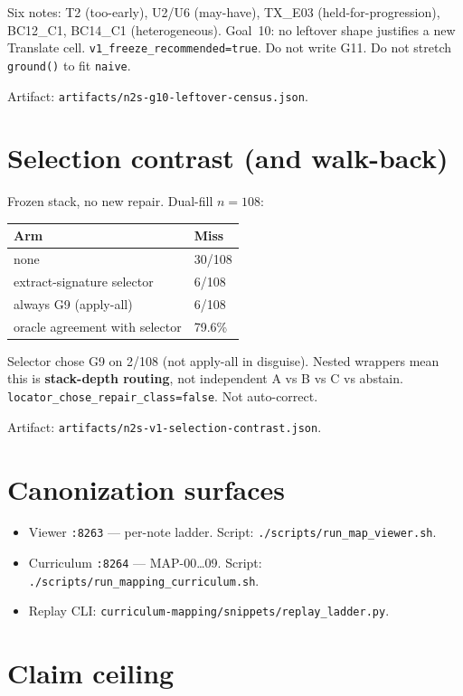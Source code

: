 \documentclass[11pt,a4paper]{article}
\begin{document}
Six notes: T2 (too-early), U2/U6 (may-have), TX\_E03 (held-for-progression), BC12\_C1, BC14\_C1 (heterogeneous).
Goal~10: no leftover shape justifies a new Translate cell. \texttt{v1\_freeze\_recommended=true}.
Do not write G11. Do not stretch \texttt{ground()} to fit \texttt{naive}.

Artifact: \texttt{artifacts/n2s-g10-leftover-census.json}.

\section{Selection contrast (and walk-back)}

Frozen stack, no new repair. Dual-fill $n=108$:

\begin{center}
\begin{tabular}{@{}ll@{}}
\toprule
Arm & Miss \\
\midrule
none & 30/108 \\
extract-signature selector & 6/108 \\
always G9 (apply-all) & 6/108 \\
oracle agreement with selector & 79.6\% \\
\bottomrule
\end{tabular}
\end{center}

Selector chose G9 on 2/108 (not apply-all in disguise). Nested wrappers mean this is \textbf{stack-depth routing}, not independent A vs B vs C vs abstain.
\texttt{locator\_chose\_repair\_class=false}. Not auto-correct.

Artifact: \texttt{artifacts/n2s-v1-selection-contrast.json}.

\section{Canonization surfaces}

\begin{itemize}
  \item Viewer \texttt{:8263} --- per-note ladder. Script: \texttt{./scripts/run\_map\_viewer.sh}.
  \item Curriculum \texttt{:8264} --- MAP-00\ldots09. Script: \texttt{./scripts/run\_mapping\_curriculum.sh}.
  \item Replay CLI: \texttt{curriculum-mapping/snippets/replay\_ladder.py}.
\end{itemize}

\section{Claim ceiling}
\end{document}
